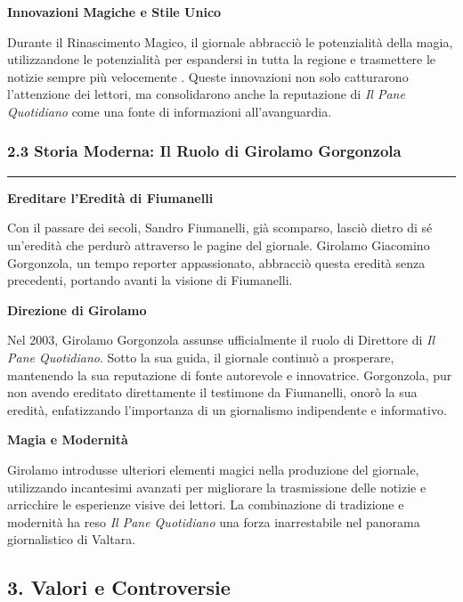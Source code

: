 \textbf{Innovazioni Magiche e Stile Unico}

Durante il Rinascimento Magico, il giornale abbracciò le potenzialità
della magia, utilizzandone le potenzialità per espandersi in tutta la
regione e trasmettere le notizie sempre più velocemente . Queste
innovazioni non solo catturarono l'attenzione dei lettori, ma
consolidarono anche la reputazione di \emph{Il Pane Quotidiano} come una
fonte di informazioni all'avanguardia.

\subsubsection{\texorpdfstring{2.3 \textbf{Storia Moderna: Il Ruolo di
Girolamo
Gorgonzola}}{2.3 Storia Moderna: Il Ruolo di Girolamo Gorgonzola}}\label{storia-moderna-il-ruolo-di-girolamo-gorgonzola}

\begin{center}\rule{0.5\linewidth}{0.5pt}\end{center}

\textbf{Ereditare l'Eredità di Fiumanelli}

Con il passare dei secoli, Sandro Fiumanelli, già scomparso, lasciò
dietro di sé un'eredità che perdurò attraverso le pagine del giornale.
Girolamo Giacomino Gorgonzola, un tempo reporter appassionato, abbracciò
questa eredità senza precedenti, portando avanti la visione di
Fiumanelli.

\textbf{Direzione di Girolamo}

Nel 2003, Girolamo Gorgonzola assunse ufficialmente il ruolo di
Direttore di \emph{Il Pane Quotidiano}. Sotto la sua guida, il giornale
continuò a prosperare, mantenendo la sua reputazione di fonte autorevole
e innovatrice. Gorgonzola, pur non avendo ereditato direttamente il
testimone da Fiumanelli, onorò la sua eredità, enfatizzando l'importanza
di un giornalismo indipendente e informativo.

\textbf{Magia e Modernità}

Girolamo introdusse ulteriori elementi magici nella produzione del
giornale, utilizzando incantesimi avanzati per migliorare la
trasmissione delle notizie e arricchire le esperienze visive dei
lettori. La combinazione di tradizione e modernità ha reso \emph{Il Pane
Quotidiano} una forza inarrestabile nel panorama giornalistico di
Valtara.

\subsection{3. Valori e Controversie}\label{valori-e-controversie}

